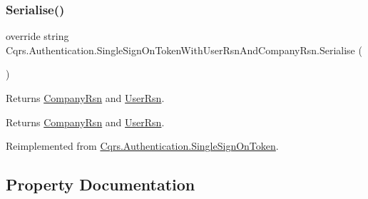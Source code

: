 \subsubsection{\texorpdfstring{Serialise()}{Serialise()}}
{\footnotesize\ttfamily override string Cqrs.\+Authentication.\+Single\+Sign\+On\+Token\+With\+User\+Rsn\+And\+Company\+Rsn.\+Serialise (\begin{DoxyParamCaption}{ }\end{DoxyParamCaption})\hspace{0.3cm}{\ttfamily [virtual]}}



Returns \hyperlink{classCqrs_1_1Authentication_1_1SingleSignOnTokenWithUserRsnAndCompanyRsn_ae81ee4a4935b762a1ed2504ea321c517_ae81ee4a4935b762a1ed2504ea321c517}{Company\+Rsn} and \hyperlink{classCqrs_1_1Authentication_1_1SingleSignOnTokenWithUserRsnAndCompanyRsn_a4963f5699921952ac8b6439d5308090d_a4963f5699921952ac8b6439d5308090d}{User\+Rsn}. 

\begin{DoxyReturn}{Returns}
\hyperlink{classCqrs_1_1Authentication_1_1SingleSignOnTokenWithUserRsnAndCompanyRsn_ae81ee4a4935b762a1ed2504ea321c517_ae81ee4a4935b762a1ed2504ea321c517}{Company\+Rsn} and \hyperlink{classCqrs_1_1Authentication_1_1SingleSignOnTokenWithUserRsnAndCompanyRsn_a4963f5699921952ac8b6439d5308090d_a4963f5699921952ac8b6439d5308090d}{User\+Rsn}.
\end{DoxyReturn}


Reimplemented from \hyperlink{classCqrs_1_1Authentication_1_1SingleSignOnToken_a5e859c6c5db5aaa9ef4e8f2086df4604_a5e859c6c5db5aaa9ef4e8f2086df4604}{Cqrs.\+Authentication.\+Single\+Sign\+On\+Token}.



\subsection{Property Documentation}
\mbox{\label{classCqrs_1_1Authentication_1_1SingleSignOnTokenWithUserRsnAndCompanyRsn_ae81ee4a4935b762a1ed2504ea321c517_ae81ee4a4935b762a1ed2504ea321c517}} 
